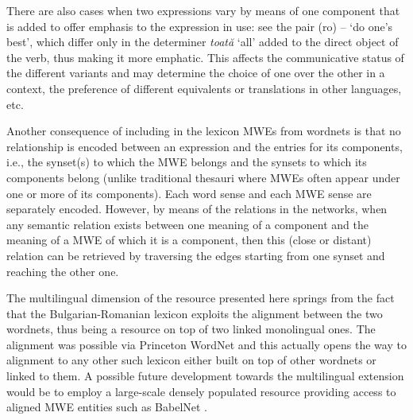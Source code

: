 \documentclass[output=paper,colorlinks,citecolor=brown]{langscibook}
\begin{document}
There are also cases when two expressions vary by means of one component that is added to offer emphasis to the expression in use: see the pair (ro)  --  `do one's best', which differ only in the determiner \textit{toată} `all' added to the direct object of the verb, thus making it more emphatic. This affects the communicative status of the different variants and may determine the choice of one over the other in a context, the preference of different equivalents or translations in other languages, etc.

Another consequence of including in the lexicon MWEs from wordnets is that no relationship is encoded between an expression and the entries for its components, i.e., the synset(s) to which the MWE belongs and the synsets to which its components belong (unlike traditional thesauri where MWEs often appear under one or more of its components). Each word sense and each MWE sense are separately encoded. However, by means of the relations in the networks, when any semantic relation exists between one meaning of a component and the meaning of a MWE of which it is a component, then this (close or distant) relation can be retrieved by traversing the edges starting from one synset and reaching the other one.

The multilingual dimension of the resource presented here springs from the fact that the Bulgarian-Romanian lexicon exploits the alignment between the two wordnets, thus being a resource on top of two linked monolingual ones. The alignment was possible via Princeton WordNet and this actually opens the way to alignment to any other such lexicon either built on top of other wordnets or linked to them. A possible future development towards the multilingual extension would be to employ a large-scale densely populated resource providing access to aligned MWE entities such as BabelNet \citep{babelnet2012}.
\end{document}
